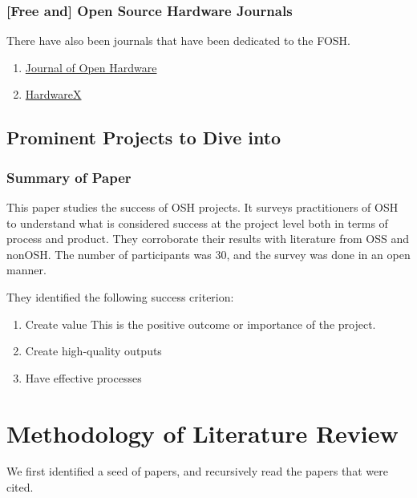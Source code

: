 \documentclass{article}
\begin{document}
\subsubsection{[Free and] Open Source Hardware Journals}
There have also been journals that have been dedicated to the FOSH.
\begin{enumerate}
    \item \href{https://openhardware.metajnl.com/}{Journal of Open Hardware}
    \item \href{https://www.sciencedirect.com/journal/hardwarex}{HardwareX}
\end{enumerate}

\subsection{Prominent Projects to Dive into}

\subsubsection{Summary of Paper}
This paper studies the success of OSH projects.
It surveys practitioners of OSH to understand what is considered success at the project level both in terms of process and product. 
They corroborate their results with literature from OSS and nonOSH.
The number of participants was 30, and the survey was done in an open manner.

They identified the following success criterion:
\begin{enumerate}
    \item Create value
        This is the positive outcome or importance of the project. 
    \item Create high-quality outputs
    \item Have effective processes
\end{enumerate}

\section{Methodology of Literature Review}
We first identified a seed of papers, and recursively read the papers that were cited.
\end{document}
